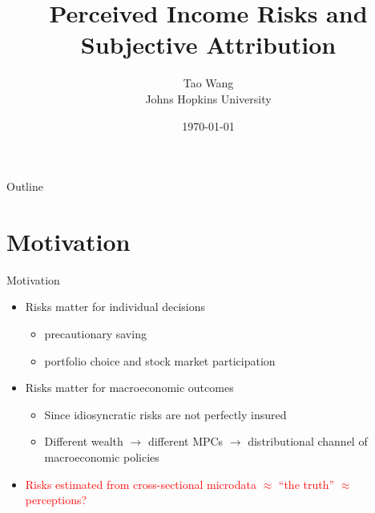 \documentclass{beamer}
\title{Perceived Income Risks and Subjective Attribution}
\author{Tao Wang \\ Johns Hopkins University}
\date{\today}
\begin{document}
	

\begin{frame}
	\titlepage
\end{frame}
\begin{frame}{Outline}
	\tableofcontents
\end{frame}


\section{Motivation}

\begin{frame}{Motivation}
	\begin{itemize}
		\item Risks matter for individual decisions
		\begin{itemize}
			\item precautionary saving
			\item portfolio choice and stock market participation
		\end{itemize} 
		\item Risks matter for macroeconomic outcomes
		\begin{itemize}
			\item Since idiosyncratic risks are not perfectly insured 
			\item Different wealth $\rightarrow$ different MPCs $\rightarrow$ distributional channel of macroeconomic policies 
		\end{itemize}  %
		\item \textcolor{red}{Risks estimated from cross-sectional microdata $\approx$  ``the truth''  $\approx$ perceptions?} %
	\end{itemize}
\end{frame}
\end{document}
